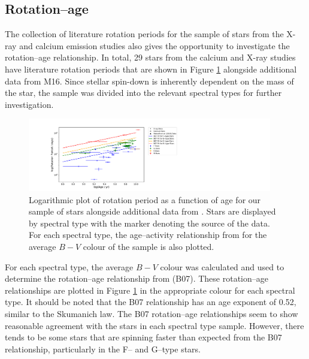 \subsection{Rotation--age}
\label{Chp5_results_rotation_age}
The collection of literature rotation periods for the sample of stars from the X-ray and calcium emission studies also gives the opportunity to investigate the rotation--age relationship. In total, 29 stars from the calcium and X-ray studies have literature rotation periods that are shown in Figure \ref{fig:full_sample_prot_v_age} alongside additional data from M16. Since stellar spin-down is inherently dependent on the mass of the star, the sample was divided into the relevant spectral types for further investigation.

\begin{figure}
    \centering
    \includegraphics[width=0.95\textwidth]{Figures/5-Activity_rotation/prot_v_age_with_B07.pdf}
    \caption[Rotation period as a function of age for full sample]{Logarithmic plot of rotation period as a function of age for our sample of stars alongside additional data from \citet{Metcalfe_etal_2016}. Stars are displayed by spectral type with the marker denoting the source of the data. For each spectral type, the age--activity relationship from \citet{Barnes_2007} for the average $B-V$ colour of the sample is also plotted.}
    \label{fig:full_sample_prot_v_age}
\end{figure}

For each spectral type, the average $B-V$ colour was calculated and used to determine the rotation--age relationship from \citet{Barnes_2007} (B07). These rotation--age relationships are plotted in Figure \ref{fig:full_sample_prot_v_age} in the appropriate colour for each spectral type. It should be noted that the B07 relationship has an age exponent of 0.52, similar to the Skumanich law. The B07 rotation--age relationships seem to show reasonable agreement with the stars in each spectral type sample. However, there tends to be some stars that are spinning faster than expected from the B07 relationship, particularly in the F-- and G--type stars.

